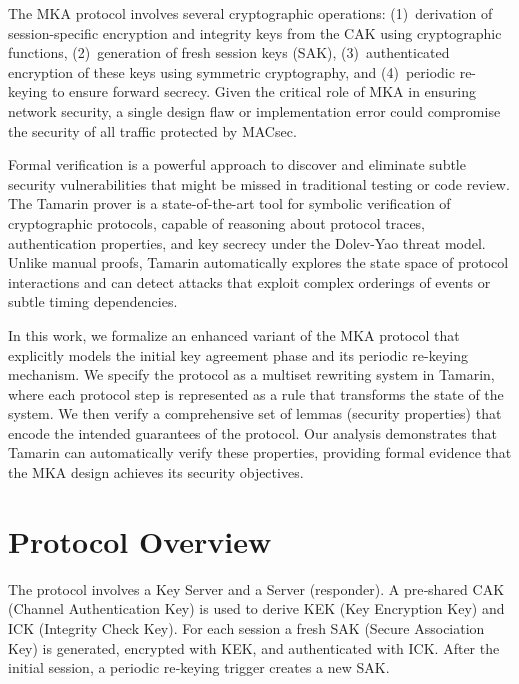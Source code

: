 \documentclass{llncs}
\begin{document}
The MKA protocol involves several cryptographic operations: (1)~derivation of session-specific encryption and integrity keys from the CAK using cryptographic functions, (2)~generation of fresh session keys (SAK), (3)~authenticated encryption of these keys using symmetric cryptography, and (4)~periodic re-keying to ensure forward secrecy. Given the critical role of MKA in ensuring network security, a single design flaw or implementation error could compromise the security of all traffic protected by MACsec.

Formal verification is a powerful approach to discover and eliminate subtle security vulnerabilities that might be missed in traditional testing or code review. The Tamarin prover is a state-of-the-art tool for symbolic verification of cryptographic protocols, capable of reasoning about protocol traces, authentication properties, and key secrecy under the Dolev-Yao threat model. Unlike manual proofs, Tamarin automatically explores the state space of protocol interactions and can detect attacks that exploit complex orderings of events or subtle timing dependencies.

In this work, we formalize an enhanced variant of the MKA protocol that explicitly models the initial key agreement phase and its periodic re-keying mechanism. We specify the protocol as a multiset rewriting system in Tamarin, where each protocol step is represented as a rule that transforms the state of the system. We then verify a comprehensive set of lemmas (security properties) that encode the intended guarantees of the protocol. Our analysis demonstrates that Tamarin can automatically verify these properties, providing formal evidence that the MKA design achieves its security objectives.

\section{Protocol Overview}
The protocol involves a Key Server and a Server (responder).  A pre‑shared CAK (Channel Authentication Key) is used to derive KEK (Key Encryption Key) and ICK (Integrity Check Key).  For each session a fresh SAK (Secure Association Key) is generated, encrypted with KEK, and authenticated with ICK.  After the initial session, a periodic re‑keying trigger creates a new SAK.
\end{document}
